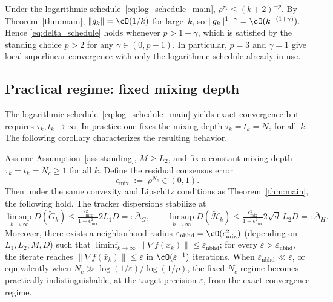 \documentclass[review,onefignum,onetabnum]{siamart171218}
\begin{document}
	\begin{remark}
		Under the logarithmic schedule~\eqref{eq:log_schedule_main},
		$\rho^{\tau_k}\le(k+2)^{-p}$.
		By Theorem~\ref{thm:main}, $\|g_k\|=\cO(1/k)$ for large~$k$, so
		$\|g_k\|^{1+\gamma}=\cO(k^{-(1+\gamma)})$.
		Hence \eqref{eq:delta_schedule} holds whenever $p>1+\gamma$,
		which is satisfied by the standing choice $p>2$ for any
		$\gamma\in(0,p{-}1)$.
		In particular, $p=3$ and $\gamma=1$ give local superlinear
		convergence with only the logarithmic schedule already in use.
	\end{remark}
	
	\subsection{Practical regime: fixed mixing depth}\label{ssec:fixed_nc}
	
	The logarithmic schedule~\eqref{eq:log_schedule_main} yields exact
	convergence but requires $\tau_k,t_k\to\infty$.
	In practice one fixes the mixing depth $\tau_k=t_k=N_c$ for all~$k$.
	The following corollary characterizes the resulting behavior.
	
	\begin{corollary}\label{cor:fixed_nc}
		Assume Assumption~\ref{ass:standing}, $M\ge L_2$, and fix a constant mixing depth $\tau_k=t_k=N_c\ge 1$ for all $k$.
		Define the residual consensus error
		\[
		\epsilon_{\mathrm{mix}} \;:=\; \rho^{N_c}\in(0,1).
		\]
		Then under the same convexity and Lipschitz conditions as Theorem~\ref{thm:main},
		the following hold.
		The tracker dispersions stabilize at
		\[
		\limsup_{k\to\infty} D(\tilde G_k)
		\le \tfrac{\epsilon_{\mathrm{mix}}^2}{1-\epsilon_{\mathrm{mix}}^2}2L_1D
		=: \bar\Delta_G,
		\qquad
		\limsup_{k\to\infty} D(\tilde{\mathcal H}_k)
		\le \tfrac{\epsilon_{\mathrm{mix}}^2}{1-\epsilon_{\mathrm{mix}}^2}2\sqrt{d}\,L_2D
		=: \bar\Delta_H.
		\]
		Moreover, there exists a neighborhood radius $\varepsilon_{\mathrm{nbhd}}=\cO(\epsilon_{\mathrm{mix}}^2)$
		(depending on $L_1,L_2,M,D$) such that
		$\liminf_{k\to\infty}\|\nabla f(\bar x_k)\|\le \varepsilon_{\mathrm{nbhd}}$;
		for every $\varepsilon>\varepsilon_{\mathrm{nbhd}}$, the iterate reaches
		$\|\nabla f(\bar x_k)\|\le \varepsilon$ in $\cO(\varepsilon^{-1})$ iterations.
		When $\varepsilon_{\mathrm{nbhd}}\ll\varepsilon$,
		or equivalently when $N_c\gg \log(1/\varepsilon)/\log(1/\rho)$,
		the fixed-$N_c$ regime becomes practically indistinguishable, at the target precision $\varepsilon$, from the exact-convergence regime.
	\end{corollary}
	
\end{document}
